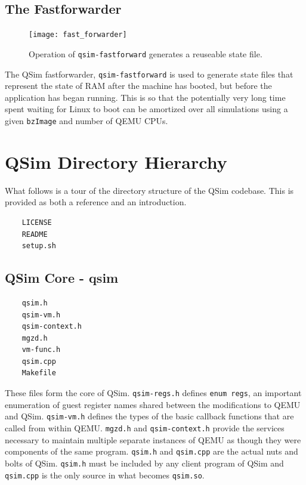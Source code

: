 \documentclass[letterpaper, 10pt]{book}
\begin{document}
\subsection{The Fastforwarder}\label{sec:fastforwarder}
\begin{figure}
\begin{centering}
\texttt{[image: fast\_forwarder]}
\caption{Operation of \texttt{qsim-fastforward} generates a reuseable state
         file.}
\label{fig:fastforwarder}
\end{centering}
\end{figure}

The QSim fastforwarder, \texttt{qsim-fastforward} is used to generate state
files that represent the state of RAM after the machine has booted, but before
the application has began running. This is so that the potentially very
long time spent waiting for Linux to boot can be amortized over all simulations
using a given \texttt{bzImage} and number of QEMU CPUs.

\section{QSim Directory Hierarchy}
What follows is a tour of the directory structure of the QSim codebase. This is
provided as both a reference and an introduction.
\begin{verbatim}
    LICENSE
    README
    setup.sh
\end{verbatim}

\subsection{QSim Core - qsim}

\begin{verbatim}
    qsim.h
    qsim-vm.h
    qsim-context.h
    mgzd.h
    vm-func.h
    qsim.cpp
    Makefile
\end{verbatim}
These files form the core of QSim. 
\texttt{qsim-regs.h} defines 
\texttt{enum regs}, an important enumeration of guest register names shared
between the modifications to QEMU and QSim.
\texttt{qsim-vm.h} defines the
types of the basic callback functions that are called from within QEMU.
\texttt{mgzd.h} and \texttt{qsim-context.h} provide the services necessary to
maintain multiple separate instances of QEMU as though they were components of
the same program. \texttt{qsim.h} and \texttt{qsim.cpp} are the actual nuts
and bolts of QSim. \texttt{qsim.h} must be included by any client program
of QSim and \texttt{qsim.cpp} is the only source in what becomes
\texttt{qsim.so}.
\end{document}
